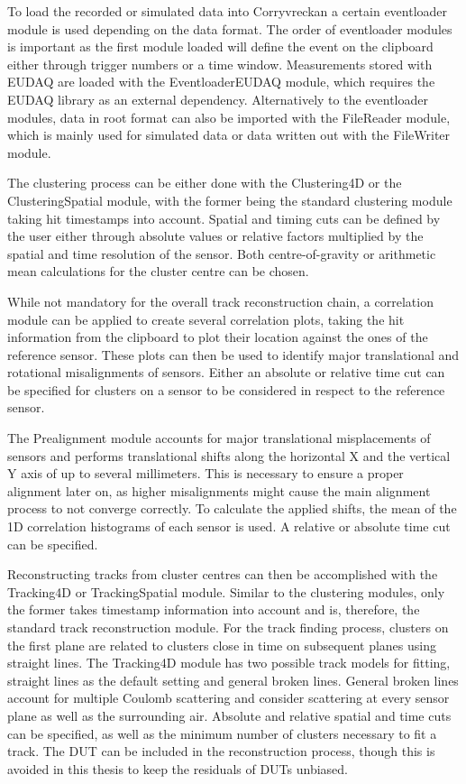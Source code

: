 To load the recorded or simulated data into Corryvreckan a certain eventloader module is used depending on the data format. The order of eventloader modules
is important as the first module loaded will define the event on the clipboard either through trigger numbers or a time window. Measurements stored with EUDAQ are loaded with the
EventloaderEUDAQ module, which requires the EUDAQ library as an external dependency. Alternatively to the eventloader modules, data in root format can also be imported
with the FileReader module, which is mainly used for simulated data or data written out with the FileWriter module.

The clustering process can be either done with the Clustering4D or the ClusteringSpatial module, with the former being the standard clustering module taking hit timestamps
into account. Spatial and timing cuts can be defined by the user either through absolute values or relative factors multiplied by the spatial and time resolution of the sensor. Both
centre-of-gravity or arithmetic mean calculations for the cluster centre can be chosen.


While not mandatory for the overall track reconstruction chain, a correlation module can be applied to create several correlation plots, taking the hit information
from the clipboard to plot their location against the ones of the reference sensor. These plots can then be used to identify major translational and
rotational misalignments of sensors.  Either an absolute or relative time cut can be specified for clusters on a sensor to be considered in respect to
the reference sensor.

The Prealignment module accounts for major translational misplacements of sensors and performs translational shifts along the horizontal X and the
vertical Y axis of up to several millimeters. This is necessary to ensure a proper alignment later on, as higher misalignments might cause the main alignment process to not converge correctly.
To calculate the applied shifts, the mean of the 1D correlation
histograms of each sensor is used. A relative or absolute time cut can be specified.

Reconstructing tracks from cluster centres can then be accomplished with the Tracking4D or TrackingSpatial module. Similar to the clustering modules, only the former
takes timestamp information into account and is, therefore, the standard track reconstruction module. For the track finding process, clusters on the first plane are
related to clusters close in time on subsequent planes using straight lines.
The Tracking4D module has two possible track models for fitting, straight lines as the default setting and general
broken lines. General broken lines account for multiple Coulomb scattering and consider scattering at every sensor plane as well as the surrounding air.
Absolute and relative spatial and time cuts can be specified, as well as the minimum number
of clusters necessary to fit a track. The DUT can be included in the reconstruction process, though this is avoided in this thesis to keep the residuals of DUTs unbiased.


